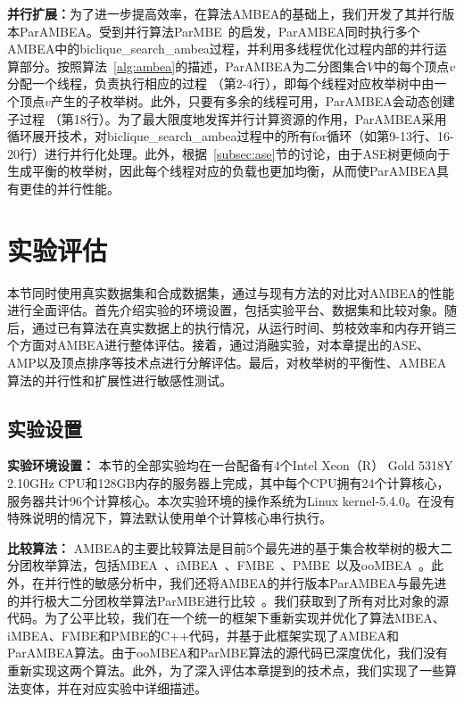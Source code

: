 \textbf{并行扩展：}为了进一步提高效率，在算法AMBEA的基础上，我们开发了其并行版本ParAMBEA。受到并行算法ParMBE~\cite{parMBE19}的启发，ParAMBEA同时执行多个AMBEA中的\textsf{biclique\_search\_ambea}过程，并利用多线程优化过程内部的并行运算部分。按照算法~\ref{alg:ambea}的描述，ParAMBEA为二分图集合$V$中的每个顶点$v$分配一个线程，负责执行相应的过程 （第2-4行），即每个线程对应枚举树中由一个顶点$v$产生的子枚举树。此外，只要有多余的线程可用，ParAMBEA会动态创建子过程 （第18行）。为了最大限度地发挥并行计算资源的作用，ParAMBEA采用循环展开技术，对\textsf{biclique\_search\_ambea}过程中的所有for循环（如第9-13行、16-20行）进行并行化处理。此外，根据~\ref{subsec:ase}节的讨论，由于ASE树更倾向于生成平衡的枚举树，因此每个线程对应的负载也更加均衡，从而使ParAMBEA具有更佳的并行性能。


\section{实验评估}

本节同时使用真实数据集和合成数据集，通过与现有方法的对比对AMBEA的性能进行全面评估。首先介绍实验的环境设置，包括实验平台、数据集和比较对象。随后，通过已有算法在真实数据上的执行情况，从运行时间、剪枝效率和内存开销三个方面对AMBEA进行整体评估。接着，通过消融实验，对本章提出的ASE、AMP以及顶点排序等技术点进行分解评估。最后，对枚举树的平衡性、AMBEA算法的并行性和扩展性进行敏感性测试。

\subsection{实验设置}

\textbf{实验环境设置：} 本节的全部实验均在一台配备有4个Intel Xeon（R） Gold 5318Y 2.10GHz CPU和128GB内存的服务器上完成，其中每个CPU拥有24个计算核心，服务器共计96个计算核心。本次实验环境的操作系统为Linux kernel-5.4.0。在没有特殊说明的情况下，算法默认使用单个计算核心串行执行。

\textbf{比较算法：} AMBEA的主要比较算法是目前5个最先进的基于集合枚举树的极大二分团枚举算法，包括MBEA~\cite{iMBEA14}、iMBEA~\cite{iMBEA14}、FMBE~\cite{parMBE19}、PMBE~\cite{PMBE20}以及ooMBEA~\cite{ooMBE22}。此外，在并行性的敏感分析中，我们还将AMBEA的并行版本ParAMBEA与最先进的并行极大二分团枚举算法ParMBE进行比较~\cite{parMBE19}。我们获取到了所有对比对象的源代码。为了公平比较，我们在一个统一的框架下重新实现并优化了算法MBEA、iMBEA、FMBE和PMBE的C++代码，并基于此框架实现了AMBEA和ParAMBEA算法。由于ooMBEA和ParMBE算法的源代码已深度优化，我们没有重新实现这两个算法。此外，为了深入评估本章提到的技术点，我们实现了一些算法变体，并在对应实验中详细描述。


